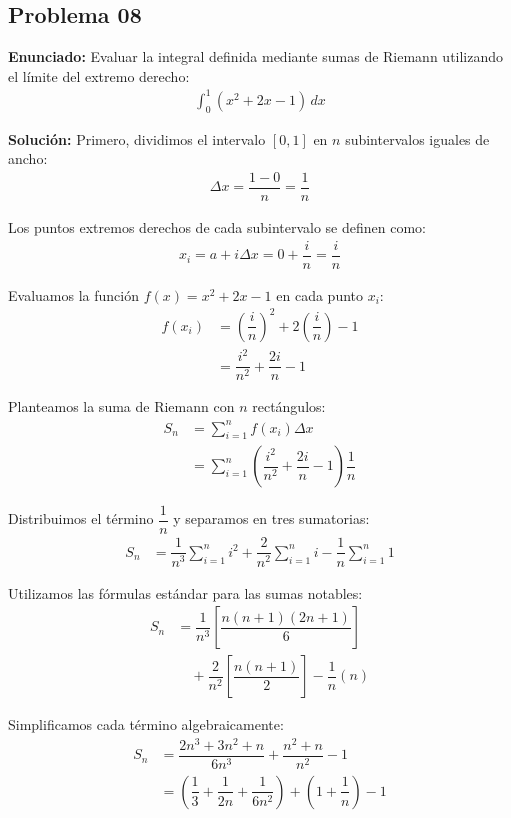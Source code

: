 \subsection*{Problema 08}

\textbf{Enunciado:} Evaluar la integral definida 
mediante sumas de Riemann utilizando el límite 
del extremo derecho:
\begin{align*}
\int_{0}^{1} (x^2 + 2x - 1) \, dx
\end{align*}

\textbf{Solución:} 
Primero, dividimos el intervalo $[0, 1]$ 
en $n$ subintervalos iguales de ancho:
\begin{align*}
\Delta x = \dfrac{1 - 0}{n} = \dfrac{1}{n}
\end{align*}

Los puntos extremos derechos de cada 
subintervalo se definen como:
\begin{align*}
x_i = a + i\Delta x = 0 + \dfrac{i}{n} = \dfrac{i}{n}
\end{align*}

Evaluamos la función $f(x) = x^2 + 2x - 1$ 
en cada punto $x_i$:
\begin{align*}
f(x_i) &= \left(\dfrac{i}{n}\right)^2 
+ 2\left(\dfrac{i}{n}\right) - 1 \\
&= \dfrac{i^2}{n^2} + \dfrac{2i}{n} - 1
\end{align*}

Planteamos la suma de Riemann con $n$ 
rectángulos:
\begin{align*}
S_n &= \sum_{i=1}^{n} f(x_i) \Delta x \\
&= \sum_{i=1}^{n} \left( \dfrac{i^2}{n^2} 
+ \dfrac{2i}{n} - 1 \right) \dfrac{1}{n}
\end{align*}

Distribuimos el término $\dfrac{1}{n}$ 
y separamos en tres sumatorias:
\begin{align*}
S_n &= \dfrac{1}{n^3} \sum_{i=1}^{n} i^2 
+ \dfrac{2}{n^2} \sum_{i=1}^{n} i 
- \dfrac{1}{n} \sum_{i=1}^{n} 1
\end{align*}

Utilizamos las fórmulas estándar para 
las sumas notables:
\begin{align*}
S_n &= \dfrac{1}{n^3} \left[ \dfrac{n(n+1)(2n+1)}{6} \right] \\
&\quad + \dfrac{2}{n^2} \left[ \dfrac{n(n+1)}{2} \right] 
- \dfrac{1}{n} (n)
\end{align*}

Simplificamos cada término algebraicamente:
\begin{align*}
S_n &= \dfrac{2n^3 + 3n^2 + n}{6n^3} 
+ \dfrac{n^2 + n}{n^2} - 1 \\
&= \left(\dfrac{1}{3} + \dfrac{1}{2n} 
+ \dfrac{1}{6n^2}\right) + \left(1 + \dfrac{1}{n}\right) - 1
\end{align*}

